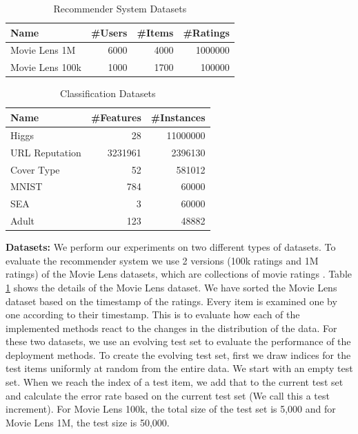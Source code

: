 \documentclass{vldb}
\begin{document}
\begin{table}\centering
\begin{tabular}{lrrr}
 \toprule
Name & \#Users & \#Items & \#Ratings
\\\midrule 
Movie Lens 1M  & 6000 & 4000 & 1000000 \\
Movie Lens 100k & 1000 & 1700 & 100000 
\\\bottomrule 
\end{tabular}
\caption{Recommender System Datasets}
\label{table:recommender-systems}
\end{table}

\begin{table}\centering
\begin{tabular}{lrr}
 \toprule
Name & \#Features  & \#Instances 
\\\midrule 
Higgs  & 28 & 11000000 \\
URL Reputation & 3231961 & 2396130 \\
Cover Type & 52 & 581012 \\
MNIST & 784 & 60000 \\
SEA & 3 & 60000 \\
Adult & 123 & 48882
\\\bottomrule 
\end{tabular}
\caption{Classification Datasets}
\end{table}

\textbf{Datasets:} We perform our experiments on two different types of datasets.
To evaluate the recommender system we use 2 versions (100k ratings and 1M ratings) of the Movie Lens datasets, which are collections of movie ratings \cite{harper2016movielens} .
Table \ref{table:recommender-systems} shows the details of the Movie Lens dataset.
We have sorted the Movie Lens dataset based on the timestamp of the ratings.
Every item is examined one by one according to their timestamp.
This is to evaluate how each of the implemented methods react to the changes in the distribution of the data.
For these two datasets, we use an evolving test set to evaluate the performance of the deployment methods.
To create the evolving test set, first we draw indices for the test items uniformly at random from the entire data.
We start with an empty test set.
When we reach the index of a test item, we add that to the current test set and calculate the error rate based on the current test set (We call this a test increment).
For Movie Lens 100k, the total size of the test set is 5,000 and for Movie Lens 1M, the test size is 50,000. 
\end{document}
